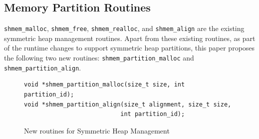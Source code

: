 



\subsection{Memory Partition Routines}
\label{src:smempart/routines}
\texttt{shmem\_malloc}, \texttt{shmem\_free}, \texttt{shmem\_realloc},
and \texttt{shmem\_align} are the existing symmetric heap management
routines. Apart from these existing routines, as part of the runtime
changes to support symmetric heap partitions, this paper proposes the
following two new routines: \texttt{shmem\_partition\_malloc} and
\texttt{shmem\_partition\_align}.

\begin{figure}
    \lstset{language=c,
            keywordstyle=\bfseries,
            basicstyle=\tt\small,
            frame=single}
    \vspace{-10pt}
    \begin{lstlisting}
void *shmem_partition_malloc(size_t size, int partition_id);
void *shmem_partition_align(size_t alignment, size_t size,
                           int partition_id);
    \end{lstlisting}
    \vspace{-10pt}
    \caption{New routines for Symmetric Heap Management}
    \vspace{-20pt}
    \label{fig:routines}
\end{figure}

